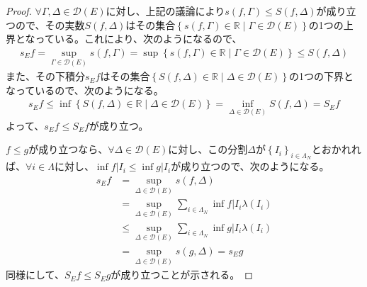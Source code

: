 \documentclass[dvipdfmx]{jsarticle}
\begin{document}
\begin{proof}
$\forall\varGamma,\varDelta \in \mathcal{D}(E)$に対し、上記の議論により$s(f,\varGamma) \leq S(f,\varDelta)$が成り立つので、その実数$S(f,\varDelta)$はその集合$\left\{ s(f,\varGamma) \in \mathbb{R} \middle| \varGamma \in \mathcal{D}(E) \right\}$の1つの上界となっている。これにより、次のようになるので、
\begin{align*}
s_{E}f = \sup_{\varGamma \in \mathcal{D}(E)}{s(f,\varGamma)} = \sup\left\{ s(f,\varGamma) \in \mathbb{R} \middle| \varGamma \in \mathcal{D}(E) \right\} \leq S(f,\varDelta)
\end{align*}
また、その下積分$s_{E}f$はその集合$\left\{ S(f,\varDelta) \in \mathbb{R} \middle| \varDelta \in \mathcal{D}(E) \right\}$の1つの下界となっているので、次のようになる。
\begin{align*}
s_{E}f \leq \inf\left\{ S(f,\varDelta) \in \mathbb{R} \middle| \varDelta \in \mathcal{D}(E) \right\} = \inf_{\varDelta \in \mathcal{D}(E)}{S(f,\varDelta)} = S_{E}f
\end{align*}
よって、$s_{E}f \leq S_{E}f$が成り立つ。\par
$f \leq g$が成り立つなら、$\forall\varDelta \in \mathcal{D}(E)$に対し、この分割$\varDelta$が$\left\{ I_{i} \right\}_{i \in \varLambda_{N} }$とおかれれば、$\forall i \in \varLambda$に対し、$\inf{f|I_{i}} \leq \inf{g|I_{i}}$が成り立つので、次のようになる。
\begin{align*}
s_{E}f &= \sup_{\varDelta \in \mathcal{D}(E)}{s(f,\varDelta)}\\
&= \sup_{\varDelta \in \mathcal{D}(E)}{\sum_{i \in \varLambda_{N}} {\inf{f|I_{i}}\lambda\left( I_{i} \right)}}\\
&\leq \sup_{\varDelta \in \mathcal{D}(E)}{\sum_{i \in \varLambda_{N}} {\inf{g|I_{i}}\lambda\left( I_{i} \right)}}\\
&= \sup_{\varDelta \in \mathcal{D}(E)}{s(g,\varDelta)} = s_{E}g
\end{align*}
同様にして、$S_{E}f \leq S_{E}g$が成り立つことが示される。
\end{proof}
\end{document}
